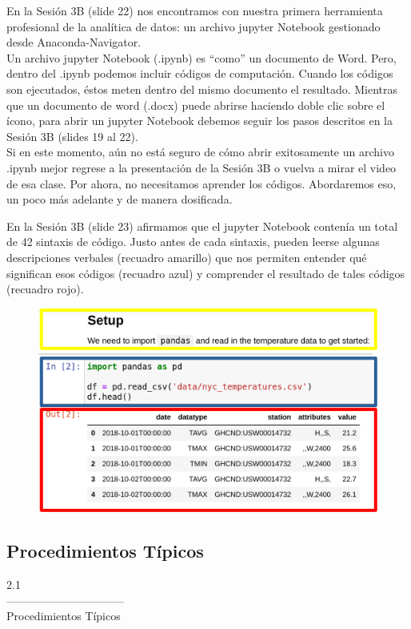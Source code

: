 \documentclass[aspectratio=169]{beamer}
\begin{document}
\begin{frame}
En la Sesión 3B (slide 22) nos encontramos con nuestra primera herramienta profesional de la analítica de datos: un archivo jupyter Notebook gestionado desde Anaconda-Navigator.\\
\vspace{0.35cm}
Un archivo jupyter Notebook (.ipynb) es ``como'' un documento de Word. Pero, dentro del .ipynb  podemos incluir códigos de computación. Cuando los códigos son ejecutados, éstos meten dentro del mismo documento el resultado. Mientras que un documento de word (.docx) puede abrirse haciendo doble clic sobre el ícono, para abrir un jupyter Notebook debemos seguir los pasos descritos en la Sesión 3B (slides 19 al 22).\\
\vspace{0.35cm}
Si en este momento, aún no está seguro de cómo abrir exitosamente un archivo .ipynb mejor regrese a la presentación de la Sesión 3B o vuelva a mirar el video de esa clase. Por ahora, no necesitamos aprender los códigos. Abordaremos eso, un poco más adelante y de manera dosificada.
\end{frame}

\begin{frame}
En la Sesión 3B (slide 23) afirmamos que el jupyter Notebook contenía un total de 42 sintaxis de código. Justo antes de cada sintaxis, pueden leerse algunas descripciones verbales (recuadro amarillo) que nos permiten entender qué significan esos códigos (recuadro azul) y comprender el resultado de tales códigos (recuadro rojo).
\begin{figure}
\centering
\includegraphics[width=.6\textwidth]{ipynb.png}
\end{figure}
\end{frame}


\subsection{Procedimientos Típicos}
\begin{frame}
\begin{center}
\Huge
\textcolor{azulcesaclaro}{2.1\\
--------------------------------\\
Procedimientos Típicos}
\end{center}
\end{frame}
\end{document}
